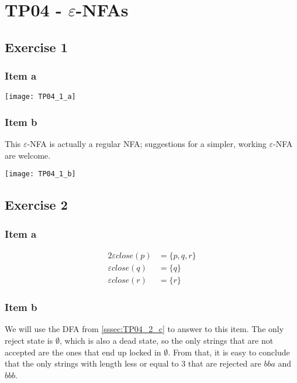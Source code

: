 \setcounter{section}{3}
\section{TP04 - \texorpdfstring{$\varepsilon$}{e}-NFAs}
{
\renewcommand{\thesubsubsection}{\thesubsection\alph{subsubsection}}
\subsection{Exercise 1}
\subsubsection{Item a}
\begin{center} \texttt{[image: TP04\_1\_a]} \end{center}
\subsubsection{Item b}
This $\varepsilon$-NFA is actually a regular NFA; suggestions for a simpler, working $\varepsilon$-NFA are welcome.
\begin{center} \texttt{[image: TP04\_1\_b]} \end{center}
\subsection{Exercise 2}
\subsubsection{Item a}
\begin{alignat*}{2}
	\varepsilon close(p)&=\{p,q,r\}\\
	\varepsilon close(q)&=\{q\}\\
	\varepsilon close(r)&=\{r\}
\end{alignat*}
\subsubsection{Item b}
We will use the DFA from \ref{sssec:TP04_2_c} to answer to this item. The only reject state is $\emptyset$, which is also a dead state, so the only strings that are not accepted are the ones that end up locked in $\emptyset$. From that, it is easy to conclude that the only strings with length less or equal to $3$ that are rejected are $bba$ and $bbb$.
}
